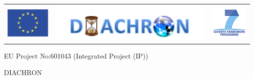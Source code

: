 \documentclass[a4paper]{article}
\begin{document}
\begin{titlepage}

\begin{center}
  \begin{tabular}{ccc}
    \includegraphics[width=.15\textwidth]{eu-logo} &
    \includegraphics[width=.6\textwidth]{diachron-logo} &
    \includegraphics[width=.15\textwidth]{fp7-logo}
  \end{tabular}
\end{center}

\vspace{4ex}
EU Project No:601043 (Integrated Project (IP))

\vspace{2ex}
DIACHRON

\vspace{2ex}


\end{titlepage}
\end{document}
